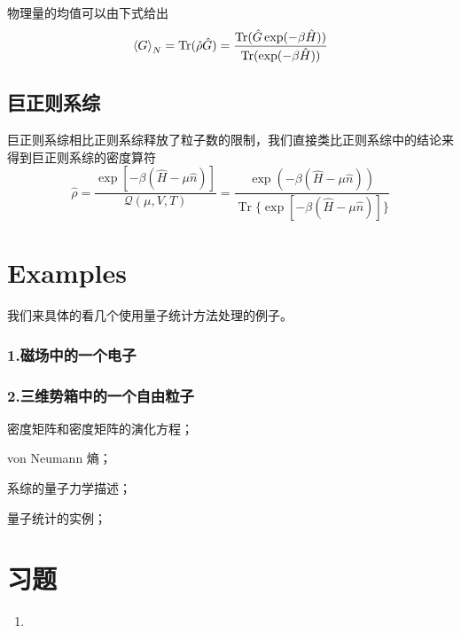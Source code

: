 物理量的均值可以由下式给出\begin{equation}
    \braket{G}_N=\operatorname{Tr} (\hat{\rho}\hat{G}) =\frac{\operatorname{Tr}(\hat{G} \exp(-\beta \hat{H}))}{\operatorname{Tr}(\exp(-\beta \hat{H}))}
\end{equation}
\subsection{巨正则系综} %
\label{sub:quantum 巨正则系综}
巨正则系综相比正则系综释放了粒子数的限制，我们直接类比正则系综中的结论来得到巨正则系综的密度算符\begin{equation}
    \hat{\rho}=\frac{\exp[-\beta( \hat{H}-\mu\hat{n})]}{\mathcal{Q}(\mu,V,T)}=\frac{\exp(-\beta( \hat{H}-\mu\hat{n}))}{\operatorname{Tr}\{\exp[-\beta (\hat{H}-\mu \hat{n})]\}}
\end{equation}

\section{Examples} %
\label{sec:Examples}
我们来具体的看几个使用量子统计方法处理的例子。

\subsubsection{1.磁场中的一个电子}
\subsubsection{2.三维势箱中的一个自由粒子}
\begin{review}
    \item 密度矩阵和密度矩阵的演化方程；
    \item von Neumann 熵；
    \item 系综的量子力学描述；
    \item 量子统计的实例；
\end{review}
\section{习题} %
\label{sec:习题3}
\begin{enumerate}
    \item 
\end{enumerate}
